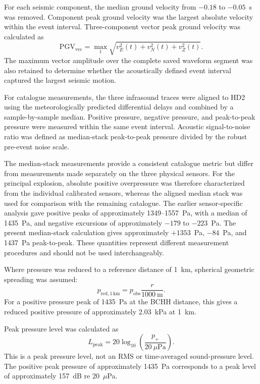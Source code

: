 \documentclass[]{seismica}
\begin{document}
For each seismic component, the median ground velocity from $-0.18$ to $-0.05$~s was removed. Component peak ground velocity was the largest absolute velocity within the event interval. Three-component vector peak ground velocity was calculated as
\begin{equation}
  \mathrm{PGV}_{\mathrm{vec}} = \max_t\sqrt{v_E^2(t)+v_N^2(t)+v_Z^2(t)}.
  \label{eq:vector_pgv}
\end{equation}
The maximum vector amplitude over the complete saved waveform segment was also retained to determine whether the acoustically defined event interval captured the largest seismic motion.

For catalogue measurements, the three infrasound traces were aligned to HD2 using the meteorologically predicted differential delays and combined by a sample-by-sample median. Positive pressure, negative pressure, and peak-to-peak pressure were measured within the same event interval. Acoustic signal-to-noise ratio was defined as median-stack peak-to-peak pressure divided by the robust pre-event noise scale.

The median-stack measurements provide a consistent catalogue metric but differ from measurements made separately on the three physical sensors. For the principal explosion, absolute positive overpressure was therefore characterized from the individual calibrated sensors, whereas the aligned median stack was used for comparison with the remaining catalogue. The earlier sensor-specific analysis gave positive peaks of approximately 1349--1557~Pa, with a median of 1435~Pa, and negative excursions of approximately $-179$ to $-223$~Pa. The present median-stack calculation gives approximately $+1353$~Pa, $-84$~Pa, and 1437~Pa peak-to-peak. These quantities represent different measurement procedures and should not be used interchangeably.

Where pressure was reduced to a reference distance of 1~km, spherical geometric spreading was assumed:
\begin{equation}
  p_{\mathrm{red},1\,\mathrm{km}} = p_{\mathrm{obs}}\frac{r}{1000~\mathrm{m}}.
  \label{eq:reduced_pressure}
\end{equation}
For a positive pressure peak of 1435~Pa at the BCHH distance, this gives a reduced positive pressure of approximately 2.03~kPa at 1~km.

Peak pressure level was calculated as
\begin{equation}
  L_{\mathrm{peak}} = 20\log_{10}\left(\frac{p_+}{20~\mu\mathrm{Pa}}\right).
  \label{eq:peak_pressure_level}
\end{equation}
This is a peak pressure level, not an RMS or time-averaged sound-pressure level. The positive peak pressure of approximately 1435~Pa corresponds to a peak level of approximately 157~dB re 20~$\mu$Pa.
\end{document}

